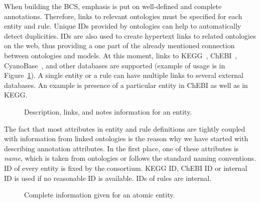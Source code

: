 \documentclass[12pt]{fithesis2}
\begin{document}
When building the BCS, emphasis is put on well-defined and complete annotations. Therefore, links to relevant ontologies must be specified for each entity and rule. Unique IDs provided by ontologies can help to automatically detect duplicities. IDs are also used to create hypertext links to related ontologies on the web, thus providing a one part of the already mentioned connection between ontologies and models. At this moment, links to KEGG~\cite{Kanehisa04012016}, ChEBI~\cite{ChEBI}, CyanoBase~\cite{CyanoBase}, and other databases are supported (example of usage is in Figure~\ref{database_links}). A single entity or a rule can have multiple links to several external databases. An example is presence of a particular entity in ChEBI as well as in KEGG.

\begin{figure}[!h]
\begin{center}
\end{center}
\caption{Description, links, and notes information for an entity.}\label{database_links}
\end{figure}

The fact that most attributes in entity and rule definitions are tightly coupled with information from linked ontologies is the reason why we have started with describing annotation attributes. In the first place, one of these attributes is \emph{name}, which is taken from ontologies or follows the standard naming conventions. ID of every entity is fixed by the consortium. KEGG ID, ChEBI ID or internal ID is used if no reasonable ID is available. IDs of rules are internal.

\begin{figure}[!h]
\begin{center}
\end{center}
\caption{Complete information given for an atomic entity.}\label{entity_example}
\end{figure}
\end{document}
